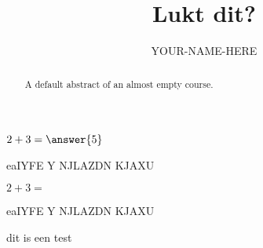 \documentclass{ximera}
\title{Lukt dit?}
\author{YOUR-NAME-HERE}
\begin{document}
\begin{abstract}
    A default abstract of an almost empty course.
\end{abstract}
\maketitle


\begin{exercise}
    $2+3=\answer{5}$
    \begin{oplossing}[toon]
        eaIYFE Y NJLAZDN KJAXU
    \end{oplossing}
\end{exercise}
\begin{exercise}
    $2+3=$
    \begin{solution}[toon]
        eaIYFE Y NJLAZDN KJAXU
    \end{solution}
\end{exercise}

\begin{definition}
    dit is een test
\end{definition}
\end{document}
